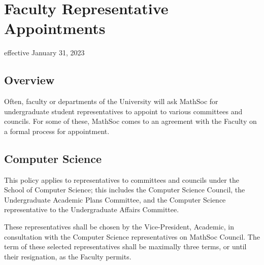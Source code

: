 \section{Faculty Representative Appointments}
effective January 31, 2023

\subsection{Overview}
Often, faculty or departments of the University will ask MathSoc for undergraduate student representatives to appoint to various committees and councils. For some of these, MathSoc comes to an agreement with the Faculty on a formal process for appointment.

\subsection{Computer Science}
This policy applies to representatives to committees and councils under the School of Computer Science; this includes the Computer Science Council, the Undergraduate Academic Plans Committee, and the Computer Science representative to the Undergraduate Affairs Committee.

These representatives shall be chosen by the Vice-President, Academic, in consultation with the Computer Science representatives on MathSoc Council. The term of these selected representatives shall be maximally three terms, or until their resignation, as the Faculty permits.
